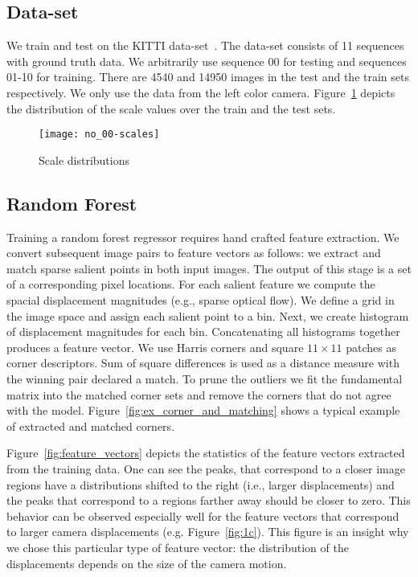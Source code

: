 \subsection{Data-set}

We train and test on the KITTI data-set~\cite{geiger2013vision}.  The
data-set consists of 11 sequences with ground truth data.  We
arbitrarily use sequence 00 for testing and sequences 01-10 for
training.  There are 4540 and 14950 images in the test and the train
sets respectively. We only use the data from the left color camera.
Figure~\ref{fig:scales} depicts the distribution of the scale values
over the train and the test sets.

\begin{figure}[!ht]
  \texttt{[image: no\_00-scales]}
  \caption{Scale distributions}
  \label{fig:scales}
\end{figure}

\subsection{Random Forest}\label{sec:features}

Training a random forest regressor requires hand crafted feature
extraction.  We convert subsequent image pairs to feature vectors as
follows: we extract and match sparse salient points in both input
images.  The output of this stage is a set of a corresponding pixel
locations.  For each salient feature we compute the spacial
displacement magnitudes (e.g., sparse optical flow).  We define a grid
in the image space and assign each salient point to a bin.  Next, we
create histogram of displacement magnitudes for each bin.
Concatenating all histograms together produces a feature vector. We
use Harris corners and square $11\times 11$ patches as corner
descriptors. Sum of square differences is used as a distance measure
with the winning pair declared a match.  To prune the outliers we fit
the fundamental matrix into the matched corner sets and remove the
corners that do not agree with the model.
Figure~\ref{fig:ex_corner_and_matching} shows a typical example of
extracted and matched corners.

Figure~\ref{fig:feature_vectors} depicts the statistics of the feature
vectors extracted from the training data. One can see the peaks, that
correspond to a closer image regions have a distributions shifted to
the right (i.e., larger displacements) and the peaks that correspond
to a regions farther away should be closer to zero.  This behavior can
be observed especially well for the feature vectors that correspond to
larger camera displacements (e.g. Figure~\ref{fig:1c}).  This figure
is an insight why we chose this particular type of feature vector: the
distribution of the displacements depends on the size of the camera
motion.

